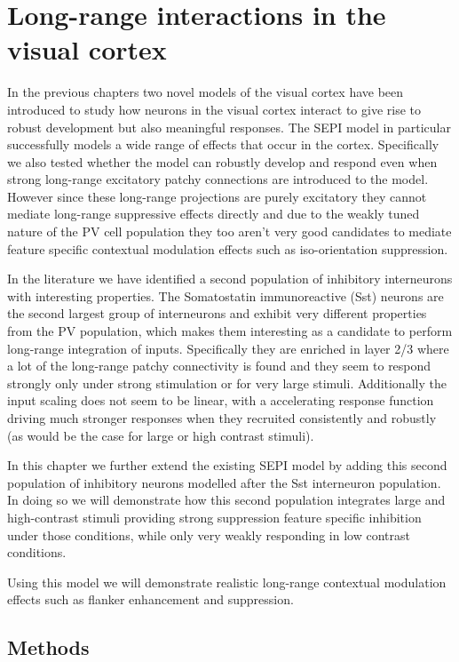 \chapter{Long-range interactions in the visual cortex}

In the previous chapters two novel models of the visual cortex have
been introduced to study how neurons in the visual cortex interact to
give rise to robust development but also meaningful responses. The
SEPI model in particular successfully models a wide range of effects
that occur in the cortex. Specifically we also tested whether the
model can robustly develop and respond even when strong long-range
excitatory patchy connections are introduced to the model. However
since these long-range projections are purely excitatory they cannot
mediate long-range suppressive effects directly and due to the weakly
tuned nature of the PV cell population they too aren't very good
candidates to mediate feature specific contextual modulation effects
such as iso-orientation suppression.

In the literature we have identified a second population of inhibitory
interneurons with interesting properties. The Somatostatin
immunoreactive (Sst) neurons are the second largest group of
interneurons and exhibit very different properties from the PV
population, which makes them interesting as a candidate to perform
long-range integration of inputs. Specifically they are enriched in
layer 2/3 where a lot of the long-range patchy connectivity is found
and they seem to respond strongly only under strong stimulation or for
very large stimuli. Additionally the input scaling does not seem to be
linear, with a accelerating response function driving much stronger
responses when they recruited consistently and robustly (as would be
the case for large or high contrast stimuli).

In this chapter we further extend the existing SEPI model by adding
this second population of inhibitory neurons modelled after the Sst
interneuron population. In doing so we will demonstrate how this
second population integrates large and high-contrast stimuli providing
strong suppression feature specific inhibition under those conditions,
while only very weakly responding in low contrast conditions.

Using this model we will demonstrate realistic long-range contextual
modulation effects such as flanker enhancement and suppression.

\section{Methods}

